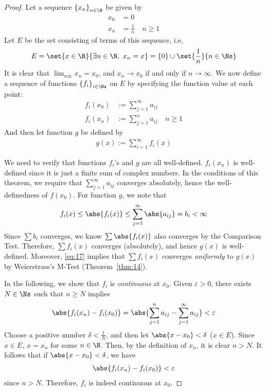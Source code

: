 \documentclass[thmcnt=section, 12pt]{elegantbook}
\begin{document}

\begin{proof}
    Let a sequence $\left\{x_n\right\}_{n \in \N}$ be given by 
    \begin{align*}
        x_0 &= 0 \\ 
        x_n &= \frac{1}{n} \quad n \geq 1
    \end{align*}
    Let $E$ be the set consisting of terms of this sequence, i.e, 
    \begin{align*}
        E = \set{x \in \R}{\exists n \in \N, \ x_n = x} = \left\{0\right\} \cup \set{\frac{1}{n}}{n \in \Ns}
    \end{align*}
    It is clear that $\lim_{n \infty} x_n = x_0$, and $x_n \to x_0$ if and only if $n \to \infty$. We now define a sequence of functions $\left\{f_i\right\}_{i \in \Ns}$ on $E$ by specifying the function value at each point:
    \begin{align*}
        f_i(x_0) &:= \sum_{j=1}^\infty a_{ij} \\ 
        f_i(x_n) &:= \sum_{j=1}^n a_{ij} 
        \quad n \geq 1
    \end{align*}
    And then let function $g$ be defined by 
    \begin{align*}
        g(x) := \sum_{i=1}^\infty f_i(x)
    \end{align*}

    \par We need to verify that functions $f_i$'s and $g$ are all well-defined. 
    $f_i(x_n)$ is well-defined since it is just a finite sum of complex numbers. In the conditions of this theorem, we require that $\sum_{j=1}^\infty a_{ij}$ converges absolutely, hence the well-definedness of $f(x_0)$.
    For function $g$, we note that 
    \begin{align}
        f_i(x) 
        \leq \abs{f_i(x)}
        \leq \sum_{j=1}^\infty \abs{a_{ij}}
        = b_i < \infty
        \label{eq:17}
    \end{align}
    Since $\sum b_i$ converges, we know $\sum \abs{f_i(x)}$ also converges by the Comparison Test. Therefore, $\sum f_i(x)$ converges (absolutely), and hence $g(x)$ is well-defined. Moreover, \eqref{eq:17} implies that $\sum f_i(x)$ converges \textit{uniformly} to $g(x)$ by Weierstrass's M-Test (Theorem~\ref{thm:14}).

    \par In the following, we show that $f_i$ is \textit{continuous} at $x_0$. Given $\varepsilon > 0$, there exists $N \in \Ns$ such that $n \geq N$ implies 
    \begin{align*}
        \abs{f_i(x_n) - f_i(x_0)}= \abs{\sum_{j=1}^n a_{ij} - \sum_{j=1}^\infty a_{ij}} < \varepsilon
    \end{align*}
    Choose a positive number $\delta < \frac{1}{N}$, and then let $\abs{x-x_0} < \delta$ ($x \in E$). Since $x \in E$, $x = x_n$ for some $n \in \N$. Then, by the definition of $x_n$, it is clear $n > N$. It follows that if $\abs{x - x_0} < \delta$, we have 
    \begin{align*}
        \abs{f_i(x_n) - f_i(x_0)} < \varepsilon
    \end{align*}
    since $n > N$. Therefore, $f_i$ is indeed continuous at $x_0$.


\end{proof}
\end{document}
